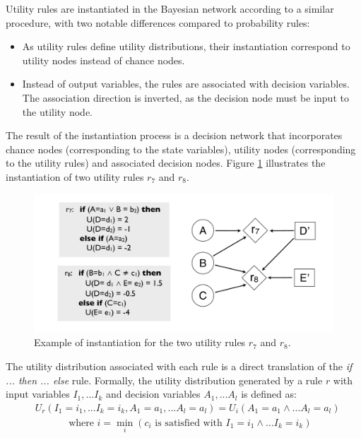 Utility rules are instantiated in the Bayesian network according to a similar procedure, with two notable differences compared to probability rules: \begin{itemize}
\item As utility rules define utility distributions, their instantiation correspond to utility nodes instead of chance nodes.
\item Instead of output variables, the rules are associated with decision variables.  The association direction is inverted, as the decision node must be input to the utility node.
\end{itemize} 

The result of the instantiation process is a decision network that incorporates chance nodes (corresponding to the state variables), utility nodes (corresponding to the utility rules) and associated decision nodes. Figure \ref{fig:instantitionutil} illustrates the instantiation of two utility rules $r_7$ and $r_8$. 

\begin{figure}[h]
\centering
\includegraphics[scale=0.25]{imgs/ruleinstantiation2.pdf}
\caption{Example of instantiation for the two utility rules $r_7$ and $r_8$.}
\label{fig:instantitionutil}
\end{figure}


The utility distribution associated with each rule is a direct translation of the  \textit{if ... then ... else} rule.  Formally, the utility distribution generated by a rule $r$ with input variables $I_1,...I_k$ and decision variables $A_1,...A_l$ is defined as:
\begin{align}
& U_r(I_1\!=\!i_1,... I_k\!=\!i_k, A_1\!=\!a_1,... A_l\!=\!a_l) = U_i(A_1\!=\!a_1 \land... A_l\!=\!a_l) \label{eq:utildistrib}\\
&  \; \; \; \; \; \; \; \;  \; \; \; \text{ where } i = \min_i (c_i \text{ is satisfied with } I_1\!=\!i_1 \land ... I_k\!=\!i_k) \nonumber
\end{align}

